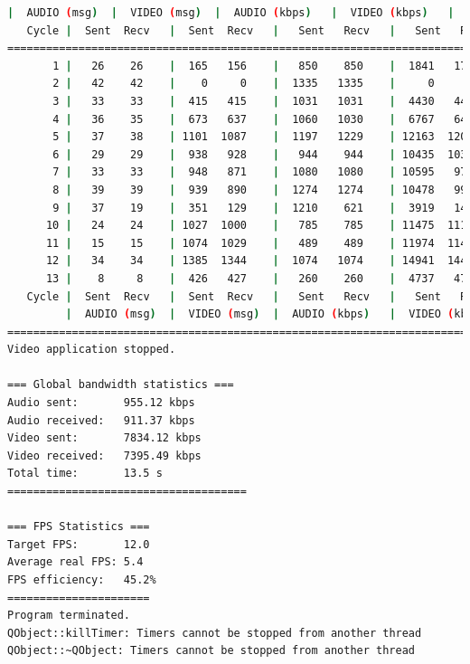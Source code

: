 \begin{lstlisting}[language=bash,basicstyle=\ttfamily\tiny]
         |  AUDIO (msg)  |  VIDEO (msg)  |  AUDIO (kbps)   |  VIDEO (kbps)   |     CPU (%) 
   Cycle |  Sent  Recv   |  Sent  Recv   |   Sent   Recv   |   Sent   Recv   | Program System
================================================================================================
       1 |   26    26    |  165   156    |   850    850    |  1841   1743    |  29      0       
       2 |   42    42    |    0     0    |  1335   1335    |     0      0    |  46     77       
       3 |   33    33    |  415   415    |  1031   1031    |  4430   4428    |  31     85       
       4 |   36    35    |  673   637    |  1060   1030    |  6767   6406    |  18     76       
       5 |   37    38    | 1101  1087    |  1197   1229    | 12163  12011    |  26     74       
       6 |   29    29    |  938   928    |   944    944    | 10435  10319    |  38     76       
       7 |   33    33    |  948   871    |  1080   1080    | 10595   9737    |  32     72       
       8 |   39    39    |  939   890    |  1274   1274    | 10478   9931    |  53     77       
       9 |   37    19    |  351   129    |  1210    621    |  3919   1440    |  48     72       
      10 |   24    24    | 1027  1000    |   785    785    | 11475  11176    |  29     77       
      11 |   15    15    | 1074  1029    |   489    489    | 11974  11474    |  33     74       
      12 |   34    34    | 1385  1344    |  1074   1074    | 14941  14497    |  33     75       
      13 |    8     8    |  426   427    |   260    260    |  4737   4751    |  10     71       
   Cycle |  Sent  Recv   |  Sent  Recv   |   Sent   Recv   |   Sent   Recv   | Program System
         |  AUDIO (msg)  |  VIDEO (msg)  |  AUDIO (kbps)   |  VIDEO (kbps)   |     CPU (%) 
===========================================================================================
Video application stopped.

=== Global bandwidth statistics ===
Audio sent:       955.12 kbps
Audio received:   911.37 kbps
Video sent:       7834.12 kbps
Video received:   7395.49 kbps
Total time:       13.5 s
=====================================

=== FPS Statistics ===
Target FPS:       12.0
Average real FPS: 5.4
FPS efficiency:   45.2%
======================
Program terminated.
QObject::killTimer: Timers cannot be stopped from another thread
QObject::~QObject: Timers cannot be stopped from another thread
\end{lstlisting}

